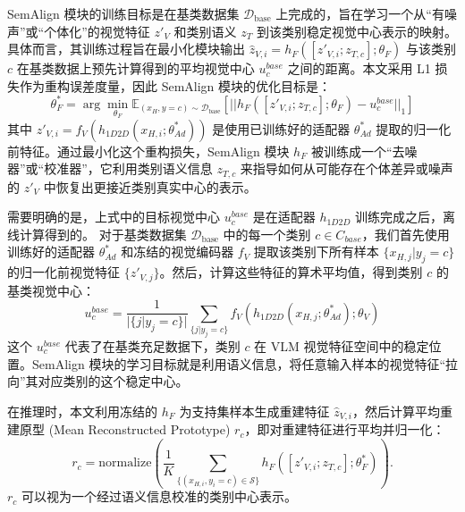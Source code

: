 SemAlign 模块的训练目标是在基类数据集 $\mathcal{D}_{\text{base}}$ 上完成的，旨在学习一个从“有噪声”或“个体化”的视觉特征 $z'_V$ 和类别语义 $z_T$ 到该类别稳定视觉中心表示的映射。 具体而言，其训练过程旨在最小化模块输出 $\hat{z}_{V,i} = h_F([z'_{V,i}; z_{T,c}]; \theta_F)$ 与该类别 $c$ 在基类数据上预先计算得到的平均视觉中心 $u_c^{base}$ 之间的距离。本文采用 L1 损失作为重构误差度量，因此 SemAlign 模块的优化目标是：
\begin{equation}
    \theta_F^* = \arg\min_{\theta_F} \mathbb{E}_{(x_H, y=c) \sim \mathcal{D}_{\text{base}}} \left[ || h_F([z'_{V,i}; z_{T,c}]; \theta_F) - u_c^{base} ||_1 \right]
    \label{eq:semalign_loss_detail}
\end{equation}
其中 $z'_{V,i} = f_V(h_{1D2D}(x_{H,i}; \theta_{Ad}^*))$ 是使用已训练好的适配器 $\theta_{Ad}^*$ 提取的归一化前特征。通过最小化这个重构损失，SemAlign 模块 $h_F$ 被训练成一个“去噪器”或“校准器”，它利用类别语义信息 $z_{T,c}$ 来指导如何从可能存在个体差异或噪声的 $z'_V$ 中恢复出更接近类别真实中心的表示。

需要明确的是，上式中的目标视觉中心 $u_c^{base}$ 是在适配器 $h_{1D2D}$ 训练完成之后，离线计算得到的。 对于基类数据集 $\mathcal{D}_{\text{base}}$ 中的每一个类别 $c \in C_{base}$，我们首先使用训练好的适配器 $\theta_{Ad}^*$ 和冻结的视觉编码器 $f_V$ 提取该类别下所有样本 $\{x_{H,j} | y_j=c\}$ 的归一化前视觉特征 $\{z'_{V,j}\}$。然后，计算这些特征的算术平均值，得到类别 $c$ 的基类视觉中心：
\begin{equation}
    u_c^{base} = \frac{1}{|\{j | y_j=c\}|} \sum_{\{j | y_j=c\}} f_V(h_{1D2D}(x_{H,j}; \theta_{Ad}^*); \theta_V)
    \label{eq:base_class_center}
\end{equation}
这个 $u_c^{base}$ 代表了在基类充足数据下，类别 $c$ 在 VLM 视觉特征空间中的稳定位置。SemAlign 模块的学习目标就是利用语义信息，将任意输入样本的视觉特征“拉向”其对应类别的这个稳定中心。

在推理时，本文利用冻结的 $h_F$ 为支持集样本生成重建特征 $\hat{z}_{V,i}$，然后计算平均重建原型 (Mean Reconstructed Prototype) $r_c$，即对重建特征进行平均并归一化：
\begin{equation} r_c = \text{normalize} \left( \frac{1}{K} \sum_{\{(x_{H,i}, y_i=c) \in \mathcal{S}\}} h_F([z'_{V,i}; z_{T,c}]; \theta_F^*) \right). \label{eq:reconstructed_prototype} \end{equation}
$r_c$ 可以视为一个经过语义信息校准的类别中心表示。

